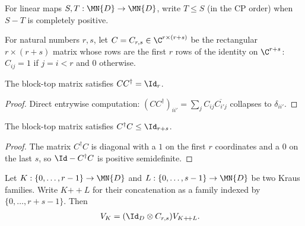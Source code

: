 \begin{definition}\label{def:cp_dominates}
    \leanok
    For linear maps $S,T:\MN{D}\to\MN{D}$, write $T\le S$ (in the CP
    order) when $S-T$ is completely positive.
\end{definition}

\begin{definition}\label{def:block_top_rows}
    \leanok
    For natural numbers $r,s$, let $C=C_{r,s}\in\C^{r\times(r+s)}$ be the
    rectangular $r\times(r+s)$ matrix whose rows are the first $r$ rows
    of the identity on $\C^{r+s}$: $C_{ij}=1$ if $j=i<r$ and $0$
    otherwise.
\end{definition}

\begin{lemma}[$C$ is a co-isometry]\label{lem:block_top_rows_co_isometry}
    \leanok
    The block-top matrix satisfies $CC^\dagger=\Id_r$.
\end{lemma}

\begin{proof}\leanok
    Direct entrywise computation:
    $(CC^\dagger)_{ii'}=\sum_jC_{ij}\overline{C_{i'j}}$
    collapses to $\delta_{ii'}$.
\end{proof}

\begin{lemma}[$C$ is a contraction]\label{lem:block_top_rows_contraction}
    \leanok
    The block-top matrix satisfies $C^\dagger C\le\Id_{r+s}$.
\end{lemma}

\begin{proof}\leanok
    The matrix $C^\dagger C$ is diagonal with a $1$ on the first $r$
    coordinates and a $0$ on the last $s$, so $\Id-C^\dagger C$ is
    positive semidefinite.
\end{proof}

\begin{lemma}\label{lem:stinespring_intertwine_append}
    \leanok
    Let $K:\{0,\ldots,r-1\}\to\MN{D}$ and
    $L:\{0,\ldots,s-1\}\to\MN{D}$ be two Kraus families. Write
    $K\mathbin{+\!+}L$ for their concatenation as a family indexed by
    $\{0,\ldots,r+s-1\}$. Then
    \begin{align}
        V_K
        &=(\Id_D\otimes C_{r,s})V_{K+\!+L}.
        \label{eq:representations_stinespring_intertwining}
    \end{align}
\end{lemma}


